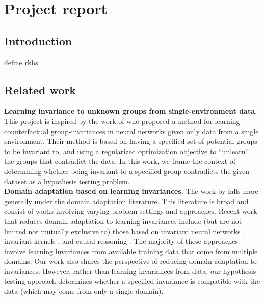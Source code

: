 

\section{Project report}

\subsection{Introduction}

\todo define rkhs

\subsection{Related work}

\textbf{Learning invariance to unknown groups from single-environment data.} This project is inspired by the work of \textcite{Mouli:2021} who proposed a method for learning counterfactual group-invariances in neural networks given only data from a single environment. Their method is based on having a specified set of potential groups to be invariant to, and using a regularized optimization objective to ``unlearn'' the groups that contradict the data. In this work, we frame the context of determining whether being invariant to a specified group contradicts the given dataset as a hypothesis testing problem.
\\

\textbf{Domain adaptation based on learning invariances.} The work by \textcite{Mouli:2021} falls more generally under the domain adaptation literature. This literature is broad and consist of works involving varying problem settings and approaches. Recent work that reduces domain adaptation to learning invariances include (but are not limited nor mutually exclusive to) those based on invariant neural networks \parencite{Li:2018,Zhao:2019,Schwobel:2021}, invariant kernels \parencite{Li:2018,Ma:2019,Elesedy:2021:equivariant,Elesedy:2021}, and causal reasoning \parencite{Magliacane:2017,Chen:2020:scm}. The majority of these approaches involve learning invariances from available training data that come from multiple domains. Our work also shares the perspective of reducing domain adaptation to invariances. However, rather than learning invariances from data, our hypothesis testing approach determines whether a specified invariance is compatible with the data (which may come from only a single domain).
\\

